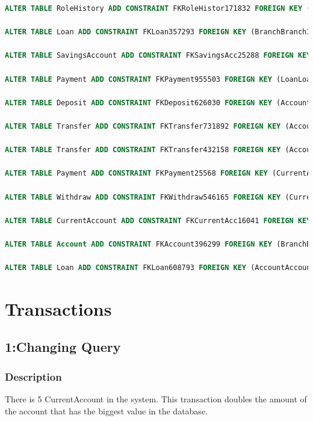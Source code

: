\documentclass[a4paper, 10pt]{article}
\begin{document}
\begin{lstlisting}[language=SQL]
ALTER TABLE RoleHistory ADD CONSTRAINT FKRoleHistor171832 FOREIGN KEY (BranchBranchId) REFERENCES Branch (BranchId);

ALTER TABLE Loan ADD CONSTRAINT FKLoan357293 FOREIGN KEY (BranchBranchId) REFERENCES Branch (BranchId);

ALTER TABLE SavingsAccount ADD CONSTRAINT FKSavingsAcc25288 FOREIGN KEY (AccountAccountID) REFERENCES Account (AccountID);

ALTER TABLE Payment ADD CONSTRAINT FKPayment955503 FOREIGN KEY (LoanLoanID) REFERENCES Loan (LoanID);

ALTER TABLE Deposit ADD CONSTRAINT FKDeposit626030 FOREIGN KEY (AccountAccountID) REFERENCES Account (AccountID);

ALTER TABLE Transfer ADD CONSTRAINT FKTransfer731892 FOREIGN KEY (AccountAccountIDFrom) REFERENCES Account (AccountID);

ALTER TABLE Transfer ADD CONSTRAINT FKTransfer432158 FOREIGN KEY (AccountAccountIDTo) REFERENCES Account (AccountID);

ALTER TABLE Payment ADD CONSTRAINT FKPayment25568 FOREIGN KEY (CurrentAccountAccountID) REFERENCES CurrentAccount (AccountAccountID);

ALTER TABLE Withdraw ADD CONSTRAINT FKWithdraw546165 FOREIGN KEY (CurrentAccountAccountID) REFERENCES CurrentAccount (AccountAccountID);

ALTER TABLE CurrentAccount ADD CONSTRAINT FKCurrentAcc16041 FOREIGN KEY (AccountAccountID) REFERENCES Account (AccountID);

ALTER TABLE Account ADD CONSTRAINT FKAccount396299 FOREIGN KEY (BranchBranchId) REFERENCES Branch (BranchId);

ALTER TABLE Loan ADD CONSTRAINT FKLoan608793 FOREIGN KEY (AccountAccountID) REFERENCES Account (AccountID);
\end{lstlisting}

\section{Transactions}

\subsection{1:Changing Query}
\subsubsection{Description}
There is 5 CurrentAccount in the system. This transaction doubles the amount of the account that has the biggest value in the database.
\end{document}
